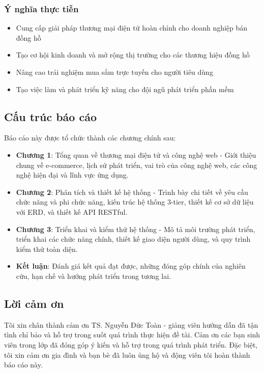 \documentclass[a4paper,12pt]{report}
\begin{document}
\subsubsection*{Ý nghĩa thực tiễn}
\begin{itemize}
    \item Cung cấp giải pháp thương mại điện tử hoàn chỉnh cho doanh nghiệp bán đồng hồ
    \item Tạo cơ hội kinh doanh và mở rộng thị trường cho các thương hiệu đồng hồ
    \item Nâng cao trải nghiệm mua sắm trực tuyến cho người tiêu dùng
    \item Tạo việc làm và phát triển kỹ năng cho đội ngũ phát triển phần mềm
\end{itemize}

\subsection*{Cấu trúc báo cáo}

Báo cáo này được tổ chức thành các chương chính sau:

\begin{itemize}
    \item \textbf{Chương 1}: Tổng quan về thương mại điện tử và công nghệ web - Giới thiệu chung về e-commerce, lịch sử phát triển, vai trò của công nghệ web, các công nghệ hiện đại và lĩnh vực ứng dụng.
    
    \item \textbf{Chương 2}: Phân tích và thiết kế hệ thống - Trình bày chi tiết về yêu cầu chức năng và phi chức năng, kiến trúc hệ thống 3-tier, thiết kế cơ sở dữ liệu với ERD, và thiết kế API RESTful.
    
    \item \textbf{Chương 3}: Triển khai và kiểm thử hệ thống - Mô tả môi trường phát triển, triển khai các chức năng chính, thiết kế giao diện người dùng, và quy trình kiểm thử toàn diện.
    
    \item \textbf{Kết luận}: Đánh giá kết quả đạt được, những đóng góp chính của nghiên cứu, hạn chế và hướng phát triển trong tương lai.
\end{itemize}

\subsection*{Lời cảm ơn}

Tôi xin chân thành cảm ơn TS. Nguyễn Đức Toàn - giảng viên hướng dẫn đã tận tình chỉ bảo và hỗ trợ trong suốt quá trình thực hiện đề tài. Cảm ơn các bạn sinh viên trong lớp đã đóng góp ý kiến và hỗ trợ trong quá trình phát triển. Đặc biệt, tôi xin cảm ơn gia đình và bạn bè đã luôn ủng hộ và động viên tôi hoàn thành báo cáo này.
\end{document}
